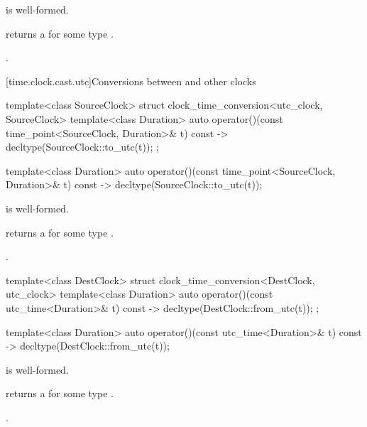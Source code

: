 \begin{itemdescr}
\pnum
\constraints
{} is well-formed.

\pnum
\mandates
{} returns a 
for some type .

\pnum
\returns
{}.
\end{itemdescr}

[time.clock.cast.utc]{Conversions between  and other clocks}

\begin{codeblock}
template<class SourceClock>
struct clock_time_conversion<utc_clock, SourceClock> {
  template<class Duration>
    auto operator()(const time_point<SourceClock, Duration>& t) const
      -> decltype(SourceClock::to_utc(t));
};
\end{codeblock}

%
\begin{itemdecl}
template<class Duration>
  auto operator()(const time_point<SourceClock, Duration>& t) const
    -> decltype(SourceClock::to_utc(t));
\end{itemdecl}

\begin{itemdescr}
\pnum
\constraints
{} is well-formed.

\pnum
\mandates
{}  returns a 
for some type .

\pnum
\returns
{}.
\end{itemdescr}

\begin{codeblock}
template<class DestClock>
struct clock_time_conversion<DestClock, utc_clock> {
  template<class Duration>
    auto operator()(const utc_time<Duration>& t) const
      -> decltype(DestClock::from_utc(t));
};
\end{codeblock}

%
\begin{itemdecl}
template<class Duration>
  auto operator()(const utc_time<Duration>& t) const
    -> decltype(DestClock::from_utc(t));
\end{itemdecl}

\begin{itemdescr}
\pnum
\constraints
{} is well-formed.

\pnum
\mandates
{} returns a 
for some type .

\pnum
\returns
{}.
\end{itemdescr}

